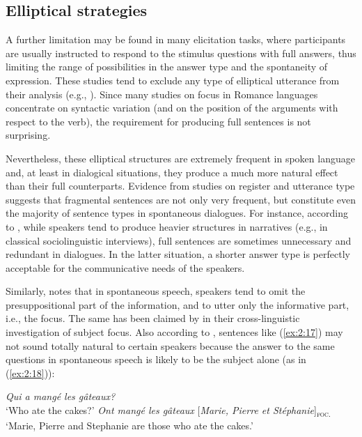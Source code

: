 \subsection{Elliptical strategies} \label{sub:3.4.2}
A further limitation may be found in many elicitation tasks, where participants are usually instructed to respond to the stimulus questions with full answers, thus limiting the range of possibilities in the answer type and the spontaneity of expression. These studies tend to exclude any type of elliptical utterance from their analysis (e.g., \cite{skopeteas2010focus}). Since many studies on focus in Romance languages concentrate on syntactic variation (and on the position of the arguments with respect to the verb), the requirement for producing full sentences is not surprising. 

Nevertheless, these elliptical structures are extremely frequent in spoken
language
and, at least in dialogical situations, they produce a much more natural effect than their full counterparts. Evidence from studies on register and utterance type suggests that fragmental sentences are not only very frequent, but constitute even the majority of sentence types in spontaneous dialogues. For instance, according to \textcite{du1987discourse}, while speakers tend to produce heavier structures in narratives (e.g., in classical sociolinguistic interviews), full sentences are sometimes unnecessary and redundant in dialogues. In the latter situation, a shorter answer type is perfectly acceptable for the communicative needs of the speakers.

Similarly, \textcite{krifka2008basic} notes that in spontaneous speech, speakers tend to omit the presuppositional part of the information, and to utter only the informative part, i.e., the focus. The same has been claimed by \textcite{fiedler2006subject} in their cross-linguistic investigation of subject focus.
Also according to \textcite{lahousse2012word}, sentences like (\ref{ex:2:17}) may not sound totally natural to certain speakers because the answer to the same questions in spontaneous speech is likely to be the subject alone (as in (\ref{ex:2:18})):

 \ea \label{ex:2:17}
\ea  \textit{Qui a mangé les gâteaux?}\\
 `Who ate the cakes?'
\ex \textit{Ont mangé les gâteaux} {[\textit{Marie, Pierre et Stéphanie}]\textsubscript{\textsc{foc.}}}\normalsize\\
`Marie, Pierre and Stephanie are those who ate the cakes.'\\

